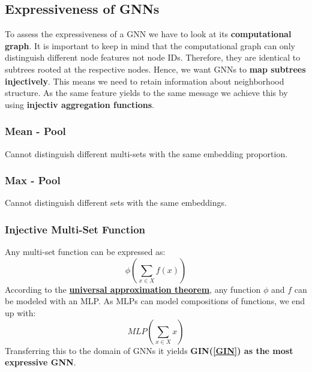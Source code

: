 \documentclass[parskip=full]{scrartcl}
\begin{document}
\subsection{Expressiveness of GNNs}
To assess the expressiveness of a GNN we have to look at its \textbf{computational graph}. It is important to keep in mind that the computational graph can only distinguish different node features not node IDs. Therefore, they are identical to subtrees rooted at the respective nodes.\newline
Hence, we want GNNs to \textbf{map subtrees injectively}. This means we need to retain information about neighborhood structure. As the same feature yields to the same message we achieve this by using \textbf{injectiv aggregation functions}.

\subsubsection{Mean - Pool}
Cannot distinguish different multi-sets with the same embedding proportion.

\subsubsection{Max - Pool}
Cannot distinguish different sets with the same embeddings.

\subsubsection{Injective Multi-Set Function}
Any multi-set function can be expressed as:
\[\phi\left(\sum_{x \in X} f(x)\right)\]
According to the \href{https://deeplearning.cs.cmu.edu/F21/document/readings/Hornik_Stinchcombe_White.pdf}{\textbf{universal approximation theorem}}, any function $\phi$ and $f$ can be modeled with an MLP. As MLPs can model compositions of functions, we end up with:
\[MLP\left(\sum_{x \in X} x\right)\]
Transferring this to the domain of GNNs it yields \textbf{GIN(\ref{GIN}) as the most expressive GNN}.
\end{document}
